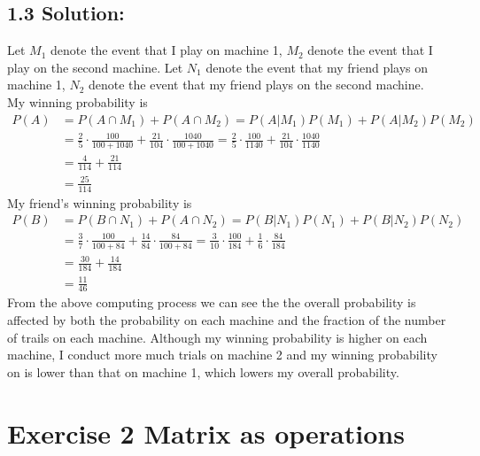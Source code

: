 \documentclass{article}
\begin{document}
\subsection*{1.3 Solution:}
Let $M_1$ denote the event that I play on machine 1, $M_2$ denote the event that I play on the second machine. Let $N_1$ denote the event that my friend plays on machine 1, $N_2$ denote the event that my friend plays on the second machine. \\
My winning probability is
\begin{align*}
    P(A) &= P(A \cap M_1) + P(A \cap M_2) = P(A | M_1) P(M_1) + P(A | M_2) P(M_2) \\
         &= \frac{2}{5} \cdot \frac{100}{100 + 1040} + \frac{21}{104} \cdot \frac{1040}{100 + 1040} = \frac{2}{5} \cdot \frac{100}{1140} + \frac{21}{104} \cdot \frac{1040}{1140} \\
         &= \frac{4}{114} + \frac{21}{114} \\
         &= \frac{25}{114}
\end{align*}
My friend's winning probability is
\begin{align*}
    P(B) &= P(B \cap N_1) + P(A \cap N_2) = P(B | N_1) P(N_1) + P(B | N_2) P(N_2) \\
         &= \frac{3}{7} \cdot \frac{100}{100 + 84} + \frac{14}{84} \cdot \frac{84}{100 + 84} = \frac{3}{10} \cdot \frac{100}{184} + \frac{1}{6} \cdot \frac{84}{184} \\
         &= \frac{30}{184} + \frac{14}{184} \\
         &= \frac{11}{46}
\end{align*}
From the above computing process we can see the the overall probability is affected by both the probability on each machine and the fraction of the number of trails on each machine. Although my winning probability is higher on each machine, I conduct more much trials on machine 2 and my winning probability on is lower than that on machine 1, which lowers my overall probability.

\section*{Exercise 2 Matrix as operations}
\end{document}
